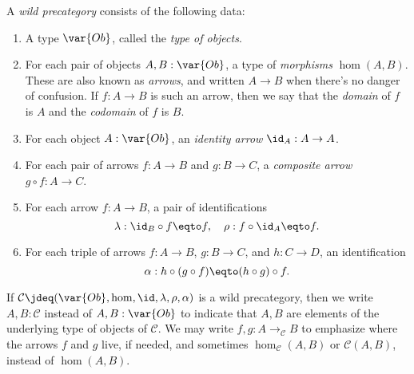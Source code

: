 \begin{definition}\label{def:wild-cat}
  A \emph{wild precategory}
  consists of the following data:
  \begin{enumerate}
  \item\label{struc:cat-ob} A type $\var{Ob}$, called the \emph{type of objects}.
  \item\label{struc:cat-mor} For each pair of objects $A,B : \var{Ob}$,
    a type of \emph{morphisms} $\hom(A,B)$. These are also known as \emph{arrows},
    and written $A \to B$ when there's no danger of confusion.
    If $f : A \to B$ is such an arrow, then we say that the \emph{domain} of $f$ is $A$
    and the \emph{codomain} of $f$ is $B$.
  \item\label{struc:cat-id} For each object $A : \var{Ob}$,
    an \emph{identity arrow} $\id_A : A \to A$.
  \item\label{struc:cat-comp} For each pair of arrows $f : A \to B$ and $g : B \to C$,
    a \emph{composite arrow} $g\circ f : A \to C$.
  \item\label{struc:cat-unit-laws} For each arrow $f : A \to B$,
    a pair of identifications
    \[
      \lambda : \id_B \circ f \eqto f, \quad
      \rho : f \circ \id_A \eqto f.
    \]
  \item\label{struct:cat-assoc} For each triple of arrows
    $f : A \to B$, $g : B \to C$, and $h : C \to D$, an identification
    \[
      \alpha : h \circ (g \circ f) \eqto (h \circ g) \circ f.
    \]
  \end{enumerate}
  If $\mathcal C \jdeq (\var{Ob},\hom,\id,\lambda,\rho,\alpha)$
  is a wild precategory, then we write $A, B : \mathcal C$ instead of $A, B : \var{Ob}$
  to indicate that $A, B$ are elements of the underlying type of objects of $\mathcal C$.
  We may write $f, g : A \to_{\mathcal C} B$ to emphasize where the arrows $f$ and $g$ live, if needed,
  and sometimes $\hom_{\mathcal C}(A,B)$ or $\mathcal C(A,B)$, instead of $\hom(A,B)$.
\end{definition}
